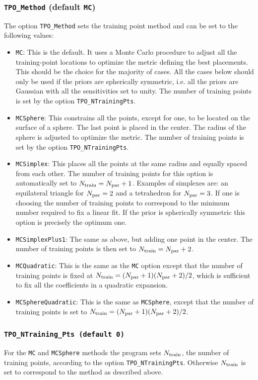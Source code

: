 \documentclass[UserManual.tex]{subfiles}
\begin{document}
\begin{sloppypar}
\subsubsection{{\tt TPO\_Method} (default {\tt MC})}
The option {\tt TPO\_Method} sets the training point method and can be set to the following values:
\begin{itemize}\itemsep 0pt
\item {\tt MC}: This is the default. It uses a Monte Carlo procedure to adjust all the training-point locations to optimize the metric defining the best placements. This should be the choice for the majority of cases. All the cases below should only be used if the priors are spherically symmetric, i.e. all the priors are Gaussian with all the sensitivities set to unity. The number of training points is set by the option {\tt TPO\_NTrainingPts}.
\item {\tt MCSphere}: This constrains all the points, except for one, to be located on the surface of a sphere. The last point is placed in the center. The radius of the sphere is adjusted to optimize the metric. The number of training points is set by the option {\tt TPO\_NTrainingPts}.
\item {\tt MCSimplex}: This places all the points at the same radius and equally spaced from each other. The number of training points for this option is automatically set to $N_{\rm train}=N_{\rm par}+1$. Examples of simplexes are: an equilateral triangle for $N_{\rm par}=2$ and a tetrahedron for $N_{\rm par}=3$. If one is choosing the number of training points to correspond to the minimum number required to fix a linear fit. If the prior is spherically symmetric this option is precisely the optimum one.
\item {\tt MCSimplexPlus1}: The same as above, but adding one point in the center. The number of training points is then set to $N_{\rm train}=N_{\rm par}+2$. 
\item {\tt MCQuadratic}: This is the same as the {\tt MC} option except that the number of training points is fixed at $N_{\rm train}=(N_{\rm par}+1)(N_{\rm par}+2)/2$, which is sufficient to fix all the coefficients in a quadratic expansion.
\item {\tt MCSphereQuadratic}: This is the same as {\tt MCSphere}, except that the number of training points is set to $N_{\rm train}=(N_{\rm par}+1)(N_{\rm par}+2)/2$.
\end{itemize}

\subsubsection{{\tt TPO\_NTraining\_Pts (default 0)}}
For the {\tt MC} and {\tt MCSphere} methods the program sets $N_{\rm train}$, the number of training points, according to the option {\tt TPO\_NTrainingPts}. Otherwise $N_{\rm train}$ is set to correspond to the method as described above.


\end{sloppypar}
\end{document}
